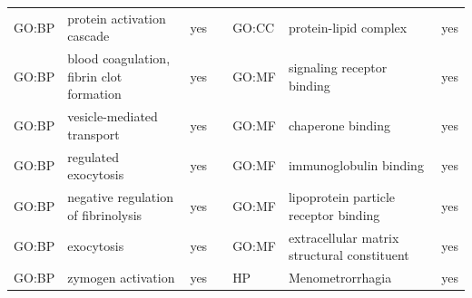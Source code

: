 \begin{longtable}{@{}lp{5cm}lllp{5cm}l@{}}
GO:BP           & protein activation cascade                                                                                                         & yes              &           & GO:CC           & protein-lipid complex                                                                                                                                                  & yes              \\
GO:BP           & blood coagulation, fibrin clot formation                                                                                           & yes              &           & GO:MF           & signaling receptor binding                                                                                                                                             & yes              \\
GO:BP           & vesicle-mediated transport                                                                                                         & yes              &           & GO:MF           & chaperone binding                                                                                                                                                      & yes              \\
GO:BP           & regulated exocytosis                                                                                                               & yes              &           & GO:MF           & immunoglobulin binding                                                                                                                                                 & yes              \\
GO:BP           & negative regulation of fibrinolysis                                                                                                & yes              &           & GO:MF           & lipoprotein particle receptor binding                                                                                                                                  & yes              \\
GO:BP           & exocytosis                                                                                                                         & yes              &           & GO:MF           & extracellular matrix structural constituent                                                                                                                            & yes              \\
GO:BP           & zymogen activation                                                                                                                 & yes              &           & HP              & Menometrorrhagia                                                                                                                                                       & yes              \\

\end{longtable}
